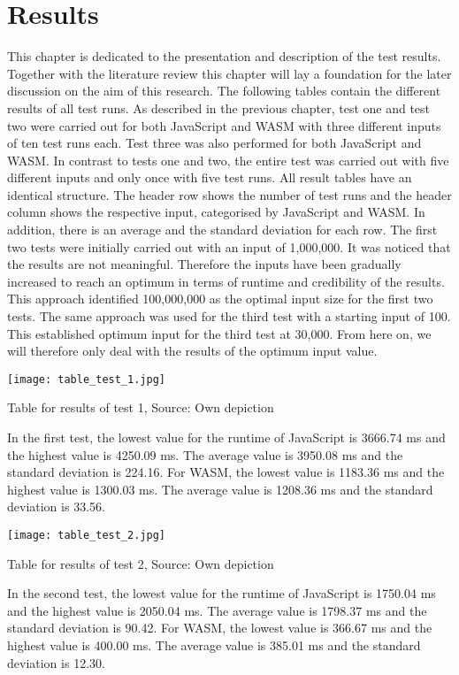 \newpage
\section{Results} \label{results}
This chapter is dedicated to the presentation and description of the test results. Together with the literature review this chapter will lay a foundation for the later discussion on the aim of this research. The following tables contain the different results of all test runs. As described in the previous chapter, test one and test two were carried out for both JavaScript and WASM with three different inputs of ten test runs each. Test three was also performed for both JavaScript and WASM. In contrast to tests one and two, the entire test was carried out with five different inputs and only once with five test runs.
All result tables have an identical structure. The header row shows the number of test runs and the header column shows the respective input, categorised by JavaScript and WASM. In addition, there is an average and the standard deviation for each row. The first two tests were initially carried out with an input of 1,000,000. It was noticed that the results are not meaningful. Therefore the inputs have been gradually increased to reach an optimum in terms of runtime and credibility of the results. This approach identified 100,000,000 as the optimal input size for the first two tests. The same approach was used for the third test with a starting input of 100. This established optimum input for the third test at 30,000. From here on, we will therefore only deal with the results of the optimum input value.
\begin{table}[H]
    \texttt{[image: table\_test\_1.jpg]}
    \centering
    \caption{Table for results of test 1, Source: Own depiction}
	\label{fig:tableTest1}
\end{table}
In the first test, the lowest value for the runtime of JavaScript is 3666.74 ms and the highest value is 4250.09 ms. The average value is 3950.08 ms and the standard deviation is 224.16. For WASM, the lowest value is 1183.36 ms and the highest value is 1300.03 ms. The average value is 1208.36 ms and the standard deviation is 33.56.
\begin{table}[H]
    \texttt{[image: table\_test\_2.jpg]}
    \centering
    \caption{Table for results of test 2, Source: Own depiction}
	\label{fig:tableTest2}
\end{table}
In the second test, the lowest value for the runtime of JavaScript is 1750.04 ms and the highest value is 2050.04 ms. The average value is 1798.37 ms and the standard deviation is 90.42. For WASM, the lowest value is 366.67 ms and the highest value is 400.00 ms. The average value is 385.01 ms and the standard deviation is 12.30.
